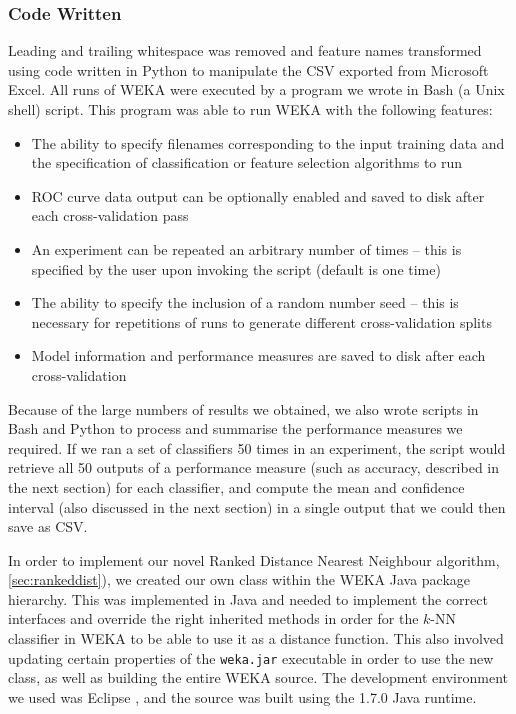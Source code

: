 \subsubsection{Code Written}
\label{sec:code}
Leading and trailing whitespace was removed and feature names transformed using
code written in Python to manipulate the CSV exported from Microsoft Excel.
All runs of WEKA were executed by
a program we wrote in Bash (a Unix shell) script. This program was able to run
WEKA with the following features:
\begin{itemize}
\item The ability to specify filenames corresponding to the input training data
and the specification of classification or feature selection algorithms to run
\item ROC curve data output can be optionally enabled and saved to disk after
each cross-validation pass
\item An experiment can be repeated an arbitrary number of times -- this is
specified by the user upon invoking the script (default is one time)
\item The ability to specify the inclusion of a random number seed -- this is
necessary for repetitions of runs to generate different cross-validation splits
\item Model information and performance measures are saved to disk after each
cross-validation
\end{itemize}

Because of the large numbers of results we obtained, we also wrote scripts in
Bash and Python to process and summarise the performance measures we required.
If we ran a set of classifiers 50 times in an experiment, the script would
retrieve all 50 outputs of a performance measure (such as accuracy, described
in the next section) for each classifier, and compute the mean and confidence
interval (also discussed in the next section) in a single output that we could
then save as CSV.

In order to implement our novel Ranked Distance Nearest Neighbour algorithm,
\ref{sec:rankeddist}), we created our own class within the WEKA Java package
hierarchy. This was implemented in Java and needed to implement the correct
interfaces and override the right inherited methods in order for the $k$-NN
classifier in WEKA to be able to use it as a distance function. This also
involved updating certain properties of the \texttt{weka.jar} executable in
order to use the new class, as well as building the entire WEKA source. The
development environment we used was Eclipse , and the
source was built using the 1.7.0 Java runtime.

